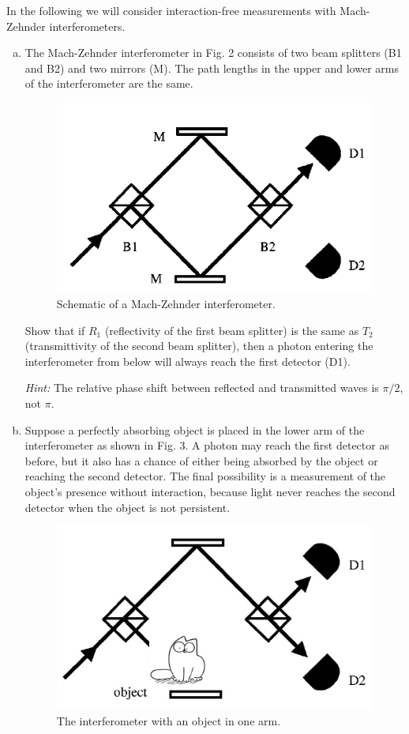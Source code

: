 \documentclass[a4paper,11pt]{article}
\begin{document}
In the following we will consider interaction-free measurements with
Mach-Zehnder interferometers.
\begin{enumerate}[a)]
\item The Mach-Zehnder interferometer in Fig. 2 consists of two beam splitters
(B1 and B2) and two mirrors (M). The path lengths in the upper and lower arms of
the interferometer are the same.

\begin{figure}[h!]
\centering
\includegraphics[scale=0.35]{images/ifm1.png}
\caption{Schematic of a Mach-Zehnder interferometer.}
\end{figure}

Show that if $R_1$ (reflectivity of the first beam splitter) is the same as $T_2$
(transmittivity of the second beam splitter), then a photon entering the interferometer
from below will always reach the first detector (D1).

{\it Hint:} The relative phase shift between reflected and transmitted waves is $\pi/2$, not $\pi$.

\item Suppose a perfectly absorbing object is placed in the lower arm of the
interferometer as shown in Fig. 3. A photon may reach the first detector as
before, but it also has a chance of either being absorbed by the object or
reaching the second detector. The final possibility is a measurement of the
object's presence without interaction, because light never reaches the second
detector when the object is not persistent.

\begin{figure}[h!]
\centering
\includegraphics[scale=0.35]{images/ifm2.png}
\caption{The interferometer with an object in one arm.}
\end{figure}


\end{enumerate}
\end{document}

